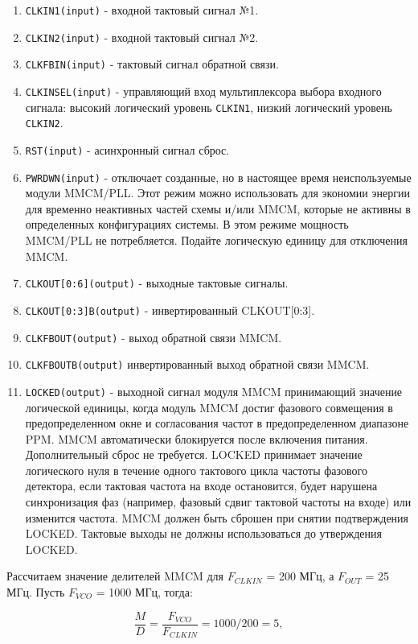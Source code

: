 \documentclass[a4paper,oneside ,10pt]{extreport}
\begin{document}
\begin{enumerate}
	\item \verb|CLKIN1(input)| - входной тактовый сигнал №1. 
	\item \verb|CLKIN2(input)| - входной тактовый сигнал №2.
	\item \verb|CLKFBIN(input)| - тактовый сигнал обратной связи.
	\item \verb|CLKINSEL(input)| - управляющий вход мультиплексора выбора входного сигнала: высокий логический уровень \verb|CLKIN1|, 
	низкий логический уровень \verb|CLKIN2|. 
	\item \verb|RST(input)| - асинхронный сигнал сброс.
	\item \verb|PWRDWN(input)| - отключает созданные, но в настоящее время неиспользуемые модули MMCM/PLL. Этот режим можно использовать для экономии энергии для временно неактивных частей схемы и/или MMCM, которые не активны в определенных конфигурациях системы. В этом режиме мощность MMCM/PLL не потребляется. Подайте логическую единицу для отключения MMCM. 
	\item \verb|CLKOUT[0:6](output)| - выходные тактовые сигналы.
	\item \verb|CLKOUT[0:3]B(output)| - инвертированный CLKOUT[0:3].
	\item \verb|CLKFBOUT(output)| - выход обратной связи MMCM.
	\item \verb|CLKFBOUTB(output)| инвертированный выход обратной связи MMCM.
	\item \verb|LOCKED(output)| - выходной сигнал модуля MMCM принимающий значение логической единицы, когда модуль MMCM достиг фазового совмещения в предопределенном окне и согласования частот в предопределенном диапазоне PPM. MMCM автоматически блокируется после включения питания. Дополнительный сброс не требуется. LOCKED принимает значение логического нуля в течение одного тактового цикла частоты фазового детектора, если тактовая частота на входе остановится, будет нарушена синхронизация фаз (например, фазовый сдвиг тактовой частоты на входе) или изменится частота. MMCM должен быть сброшен при снятии подтверждения LOCKED. Тактовые выходы не должны использоваться до утверждения LOCKED.
\end{enumerate}

Рассчитаем значение делителей MMCM для \(F_{CLKIN}\) = 200 МГц, а \(F_{OUT}\) = 25 МГц. Пусть \(F_{VCO}\) = 1000 МГц, тогда:

\begin{equation}	
	 \frac{M}{D}  =  \frac{F_{VCO}}{F_{CLKIN}} = 1000/200 = 5,
\end{equation}
\end{document}
